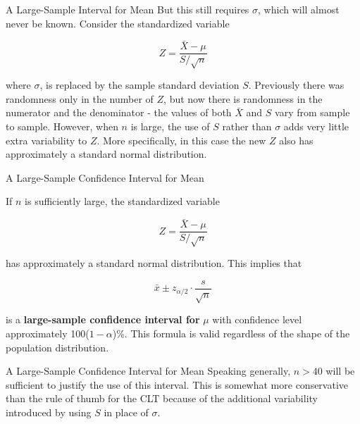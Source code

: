 \documentclass[
  ignorenonframetext,
]{beamer}
\begin{document}
\begin{frame}{A Large-Sample Interval for Mean}
\protect\hypertarget{a-large-sample-interval-for-mean-1}{}
But this still requires \(\sigma\), which will almost never be known.
Consider the standardized variable

\[
Z = \frac{\bar{X} - \mu}{S/\sqrt{n}}
\]

where \(\sigma\), is replaced by the sample standard deviation \(S\).
Previously there was randomness only in the number of \(Z\), but now
there is randomness in the numerator and the denominator - the values of
both \(\bar{X}\) and \(S\) vary from sample to sample. However, when
\(n\) is large, the use of \(S\) rather than \(\sigma\) adds very little
extra variability to \(Z\). More specifically, in this case the new
\(Z\) also has approximately a standard normal distribution.
\end{frame}

\begin{frame}{A Large-Sample Confidence Interval for Mean}
\protect\hypertarget{a-large-sample-confidence-interval-for-mean}{}
\begin{tcolorbox}[enhanced jigsaw, titlerule=0mm, colbacktitle=quarto-callout-important-color!10!white, opacityback=0, bottomrule=.15mm, colback=white, colframe=quarto-callout-important-color-frame, arc=.35mm, title=\textcolor{quarto-callout-important-color}{\faExclamation}\hspace{0.5em}{Proposition}, toprule=.15mm, breakable, coltitle=black, leftrule=.75mm, bottomtitle=1mm, left=2mm, rightrule=.15mm, toptitle=1mm, opacitybacktitle=0.6]

If \(n\) is sufficiently large, the standardized variable

\[
Z = \frac{\bar{X} - \mu}{S/\sqrt{n}}
\]

has approximately a standard normal distribution. This implies that

\[
\bar{x} \pm z_{\alpha/2}\cdot \frac{s}{\sqrt{n}}
\]

is a \textbf{large-sample confidence interval for} \(\mu\) with
confidence level approximately 100(\(1-\alpha\))\%. This formula is
valid regardless of the shape of the population distribution.

\end{tcolorbox}
\end{frame}

\begin{frame}{A Large-Sample Confidence Interval for Mean}
\protect\hypertarget{a-large-sample-confidence-interval-for-mean-1}{}
Speaking generally, \(n>40\) will be sufficient to justify the use of
this interval. This is somewhat more conservative than the rule of thumb
for the CLT because of the additional variability introduced by using
\(S\) in place of \(\sigma\).
\end{frame}
\end{document}
